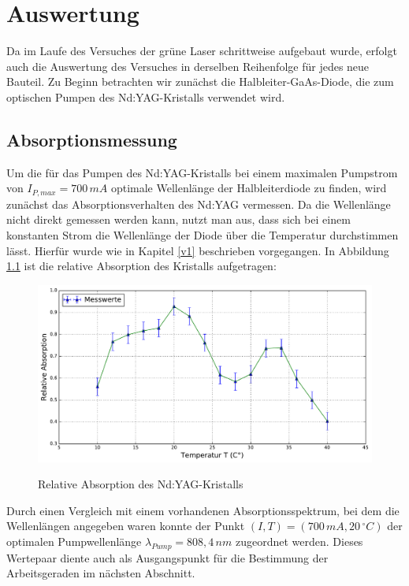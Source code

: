 \documentclass[twoside,colorback,accentcolor=tud4c,11pt]{tudreport}
\begin{document}
     	
\chapter{Auswertung}
Da im Laufe des Versuches der grüne Laser schrittweise aufgebaut wurde, erfolgt auch die  Auswertung des Versuches in derselben Reihenfolge für jedes neue Bauteil. Zu Beginn betrachten wir zunächst die Halbleiter-GaAs-Diode, die zum optischen Pumpen des Nd:YAG-Kristalls verwendet wird.
\section{Absorptionsmessung}
Um die für das Pumpen des Nd:YAG-Kristalls bei einem maximalen Pumpstrom von $I_{P,max}=700\,\si{mA}$ optimale Wellenlänge der Halbleiterdiode zu finden, wird zunächst das Absorptionsverhalten des Nd:YAG vermessen. Da die Wellenlänge nicht direkt gemessen werden kann, nutzt man aus, dass sich bei einem konstanten Strom die Wellenlänge der Diode über die Temperatur durchstimmen lässt. Hierfür wurde wie in Kapitel \ref{v1} beschrieben vorgegangen. In Abbildung \ref{abs} ist die relative Absorption des Kristalls aufgetragen:
\begin{figure}[H]
\centering
   	\begin{minipage}[b]{0.85\textwidth}
   	\includegraphics[width=\textwidth]{graphics/relabs_ndyag.pdf}
  	\label{abs}
   	\end{minipage}
\caption{Relative Absorption des Nd:YAG-Kristalls}	
\end{figure}
Durch einen Vergleich mit einem vorhandenen Absorptionsspektrum, bei dem die Wellenlängen angegeben waren konnte der Punkt $(I,T)=(700\,\si{mA},20\,\si{^{\circ}C})$ der optimalen Pumpwellenlänge $\lambda_{Pump}=808,4\,\si{nm}$ zugeordnet werden. Dieses Wertepaar diente auch als Ausgangspunkt für die Bestimmung der Arbeitsgeraden im nächsten Abschnitt.
\end{document}
